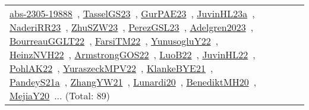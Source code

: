 {\begin{longtable}{lp{3cm}>{\raggedright\arraybackslash}p{6cm}>{\raggedright\arraybackslash}p{6cm}>{\raggedright\arraybackslash}p{8cm}}
\href{works/abs-2305-19888.pdf}{abs-2305-19888}~\cite{abs-2305-19888}, \href{works/TasselGS23.pdf}{TasselGS23}~\cite{TasselGS23}, \href{works/GurPAE23.pdf}{GurPAE23}~\cite{GurPAE23}, \href{works/JuvinHL23a.pdf}{JuvinHL23a}~\cite{JuvinHL23a}, \href{works/NaderiRR23.pdf}{NaderiRR23}~\cite{NaderiRR23}, \href{works/ZhuSZW23.pdf}{ZhuSZW23}~\cite{ZhuSZW23}, \href{works/PerezGSL23.pdf}{PerezGSL23}~\cite{PerezGSL23}, \href{works/Adelgren2023.pdf}{Adelgren2023}~\cite{Adelgren2023}, \href{works/BourreauGGLT22.pdf}{BourreauGGLT22}~\cite{BourreauGGLT22}, \href{works/FarsiTM22.pdf}{FarsiTM22}~\cite{FarsiTM22}, \href{works/YunusogluY22.pdf}{YunusogluY22}~\cite{YunusogluY22}, \href{works/HeinzNVH22.pdf}{HeinzNVH22}~\cite{HeinzNVH22}, \href{works/ArmstrongGOS22.pdf}{ArmstrongGOS22}~\cite{ArmstrongGOS22}, \href{works/LuoB22.pdf}{LuoB22}~\cite{LuoB22}, \href{works/JuvinHL22.pdf}{JuvinHL22}~\cite{JuvinHL22}, \href{works/PohlAK22.pdf}{PohlAK22}~\cite{PohlAK22}, \href{works/YuraszeckMPV22.pdf}{YuraszeckMPV22}~\cite{YuraszeckMPV22}, \href{works/KlankeBYE21.pdf}{KlankeBYE21}~\cite{KlankeBYE21}, \href{works/PandeyS21a.pdf}{PandeyS21a}~\cite{PandeyS21a}, \href{works/ZhangYW21.pdf}{ZhangYW21}~\cite{ZhangYW21}, \href{works/Lunardi20.pdf}{Lunardi20}~\cite{Lunardi20}, \href{works/BenediktMH20.pdf}{BenediktMH20}~\cite{BenediktMH20}, \href{works/MejiaY20.pdf}{MejiaY20}~\cite{MejiaY20}... (Total: 89)\\

\end{longtable}}
